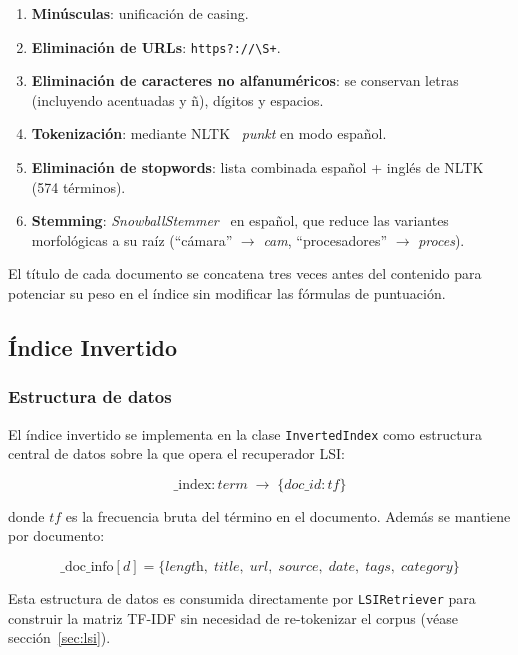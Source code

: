 \documentclass{llncs}
\begin{document}
\begin{enumerate}
  \item \textbf{Minúsculas}: unificación de casing.
  \item \textbf{Eliminación de URLs}: \texttt{https?://\textbackslash{}S+}.
  \item \textbf{Eliminación de caracteres no alfanuméricos}: se conservan
    letras (incluyendo acentuadas y ñ), dígitos y espacios.
  \item \textbf{Tokenización}: mediante NLTK~\cite{bird2009} \textit{punkt} en modo español.
  \item \textbf{Eliminación de stopwords}: lista combinada español + inglés
    de NLTK~\cite{bird2009} (574 términos).
  \item \textbf{Stemming}: \textit{SnowballStemmer}~\cite{bird2009} en español, que reduce
    las variantes morfológicas a su raíz (``cámara'' $\to$ \textit{cam},
    ``procesadores'' $\to$ \textit{proces}).
\end{enumerate}

El título de cada documento se concatena tres veces antes del contenido para
potenciar su peso en el índice sin modificar las fórmulas de puntuación.

\subsection{Índice Invertido}
\label{sec:index}

\subsubsection{Estructura de datos}

El índice invertido se implementa en la clase \texttt{InvertedIndex} como
estructura central de datos sobre la que opera el recuperador LSI:

\[
  \text{\_index} : \textit{term} \;\longrightarrow\; \{doc\_id : tf\}
\]

donde $tf$ es la frecuencia bruta del término en el documento.  Además se
mantiene por documento:

\[
  \text{\_doc\_info}[d] = \{
    \textit{length},\; \textit{title},\; \textit{url},\;
    \textit{source},\; \textit{date},\; \textit{tags},\; \textit{category}
  \}
\]

Esta estructura de datos es consumida directamente por \texttt{LSIRetriever}
para construir la matriz TF-IDF sin necesidad de re-tokenizar el corpus
(véase sección~\ref{sec:lsi}).
\end{document}
